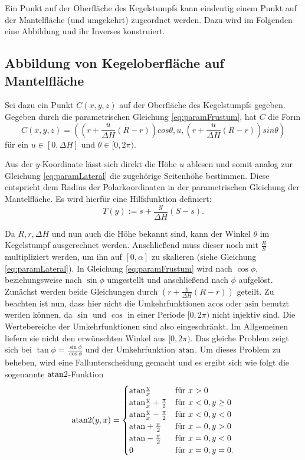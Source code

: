 Ein Punkt auf der Oberfläche des Kegelstumpfs kann eindeutig einem Punkt auf der Mantelfläche (und umgekehrt) zugeordnet werden. Dazu wird im Folgenden eine Abbildung und ihr Inverses konstruiert.

\subsection{Abbildung von Kegeloberfläche auf Mantelfläche}
Sei dazu ein Punkt $C(x,y,z)$ auf der Oberfläche des Kegelstumpfs gegeben. Gegeben durch die parametrischen Gleichung \ref{eq:paramFrustum}, hat $C$ die Form
\[
C(x,y,z) = \left(\left(r + \frac{u}{\Delta H} (R - r)\right)cos \theta, u, \left(r + \frac{u}{\Delta H} (R - r)\right)sin \theta\right)
\]  für ein $u\in [0, \Delta H]$ und $\theta \in [0, 2\pi)$.

Aus der $y$-Koordinate lässt sich direkt die Höhe $u$ ablesen und somit analog zur Gleichung \ref{eq:paramLateral} die zugehörige Seitenhöhe bestimmen. Diese entspricht dem Radius der Polarkoordinaten in der parametrischen Gleichung der Mantelfläche. Es wird hierfür eine Hilfsfunktion definiert:
\begin{equation} \label{eq:help1}
	T(y) := s + \frac{y}{\Delta H} (S-s).
\end{equation}


Da $R, r, \Delta H$  und nun auch die Höhe bekannt sind, kann der Winkel $\theta$ im Kegelstumpf ausgerechnet werden. Anschließend muss dieser noch mit  $\frac{R}{S}$ multipliziert werden, um ihn auf $[0, \alpha]$ zu skalieren (siehe Gleichung \ref{eq:paramLateral}).  In Gleichung \ref{eq:paramFrustum} wird nach $\cos\phi$, beziehungsweise nach $\sin\phi$ umgestellt und anschließend nach $\phi$ aufgelöst.
Zunächst werden beide Gleichungen durch $\left(r + \frac{y}{\Delta H} (R - r)\right)$ geteilt. Zu beachten ist nun, dass hier nicht die Umkehrfunktionen $\text{acos}$ oder $\text{asin}$ benutzt werden können, da $\sin$ und $\cos$ in einer Periode $[0, 2\pi)$ nicht injektiv sind. Die Wertebereiche der Umkehrfunktionen sind also eingeschränkt. Im Allgemeinen liefern sie nicht den erwünschten Winkel aus $[0, 2\pi)$.
Das gleiche Problem zeigt sich bei $\tan\phi = \frac{\sin\phi}{\cos\phi}$ und der Umkehrfunktion $\text{atan}$. Um dieses Problem zu beheben, wird eine Fallunterscheidung gemacht und es ergibt sich wie folgt die sogenannte $\text{atan2}$-Funktion
\[
\text{atan2}(y,x) = 	\begin{cases}
					\text{atan} \frac{y}{x} 					& \mbox{für } x > 0 \\
					\text{atan} \frac{y}{x} + \frac{\pi}{2}	& \mbox{für } x < 0, y \geq 0 \\
					\text{atan} \frac{y}{x} - \frac{\pi}{2}	& \mbox{für } x < 0, y < 0 \\
					\text{atan} +\frac{\pi}{2}				& \mbox{für } x = 0, y > 0 \\
					\text{atan} -\frac{\pi}{2}				& \mbox{für } x = 0, y < 0 \\
					0									& \mbox{für } x = 0, y = 0.
				\end{cases}
\]

